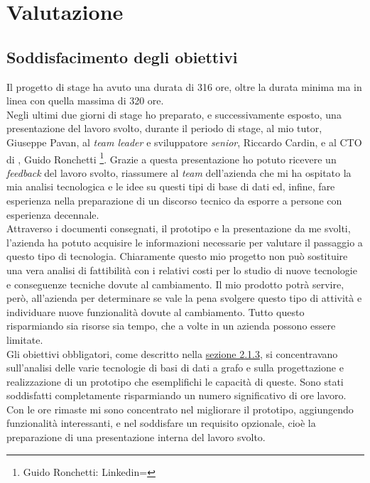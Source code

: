 
\chapter{Valutazione}
\label{cap:resoconto-stage}

\section{Soddisfacimento degli obiettivi}
Il progetto di stage ha avuto una durata di 316 ore, oltre la durata minima ma in linea con quella massima di 320 ore.\\
Negli ultimi due giorni di stage ho preparato, e successivamente esposto, una presentazione del lavoro svolto, durante il periodo di stage, al mio tutor, Giuseppe Pavan, al \textit{team leader} e sviluppatore \textit{senior}, Riccardo Cardin, e al CTO di \textit{\azienda}, Guido Ronchetti \footnote{Guido Ronchetti: Linkedin= }. Grazie a questa presentazione ho potuto ricevere un \textit{feedback} del lavoro svolto, riassumere al \textit{team} dell'azienda che mi ha ospitato la mia analisi tecnologica e le idee su questi tipi di base di dati ed, infine, fare esperienza nella preparazione di un discorso tecnico da esporre a persone con esperienza decennale.\\
Attraverso i documenti consegnati, il prototipo e la presentazione da me svolti, l'azienda ha potuto acquisire le informazioni necessarie per valutare il passaggio a questo tipo di tecnologia. Chiaramente questo mio progetto non può sostituire una vera analisi di fattibilità con i relativi costi per lo studio di nuove tecnologie e conseguenze tecniche dovute al cambiamento. Il mio prodotto potrà servire, però, all'azienda per determinare se vale la pena svolgere questo tipo di attività e individuare nuove funzionalità dovute al cambiamento. Tutto questo risparmiando sia risorse sia tempo, che a volte in un azienda possono essere limitate.\\
Gli obiettivi obbligatori, come descritto nella \hyperlink{sec:pianodl}{sezione 2.1.3}, si concentravano sull'analisi delle varie tecnologie di basi di dati a grafo e sulla progettazione e realizzazione di un prototipo che esemplifichi le capacità di queste. Sono stati soddisfatti completamente risparmiando un numero significativo di ore lavoro. Con le ore rimaste mi sono concentrato nel migliorare il prototipo, aggiungendo funzionalità interessanti, e nel soddisfare un requisito opzionale, cioè la preparazione di una presentazione interna del lavoro svolto.
\newpage
